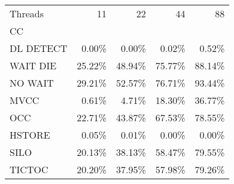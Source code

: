 \begin{tabular}{lrrrr}
\toprule
Threads &     11 &     22 &     44 &     88 \\
CC        &        &        &        &        \\
\midrule
DL DETECT &  0.00\% &  0.00\% &  0.02\% &  0.52\% \\
WAIT DIE  & 25.22\% & 48.94\% & 75.77\% & 88.14\% \\
NO WAIT   & 29.21\% & 52.57\% & 76.71\% & 93.44\% \\
MVCC      &  0.61\% &  4.71\% & 18.30\% & 36.77\% \\
OCC       & 22.71\% & 43.87\% & 67.53\% & 78.55\% \\
HSTORE    &  0.05\% &  0.01\% &  0.00\% &  0.00\% \\
SILO      & 20.13\% & 38.13\% & 58.47\% & 79.55\% \\
TICTOC    & 20.20\% & 37.95\% & 57.98\% & 79.26\% \\
\bottomrule
\end{tabular}
